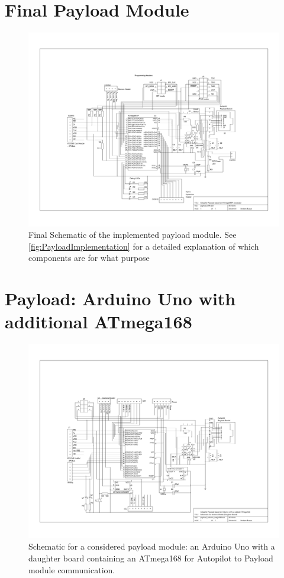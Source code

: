 \section{Final Payload Module}
\label{Payload_Schematic}
\begin{figure}[H]
\includegraphics[width=1.4\textwidth, angle=90]{schematics/payload_644.pdf}
\caption{Final Schematic of the implemented payload module. See \ref{fig:PayloadImplementation} for a 
detailed explanation of which components are for what purpose}
\end{figure}

\section{Payload: Arduino Uno with additional ATmega168}
\begin{figure}[H]
\includegraphics[width=1.4\textwidth, angle=90]{schematics/payload_arduino_mega168.pdf}
\caption{Schematic for a considered payload module: an 
Arduino Uno with a daughter board containing an ATmega168 for Autopilot to 
Payload module communication.}
\end{figure}

